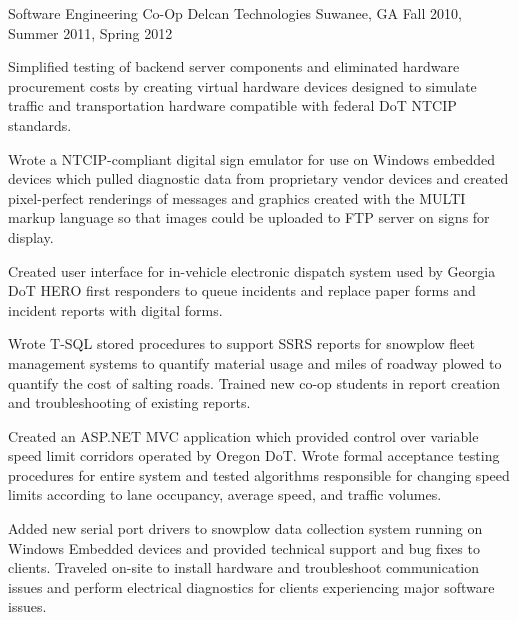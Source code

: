 \begin{cventries}
  \cventry
    {Software Engineering Co-Op} %
    {Delcan Technologies} %
    {Suwanee, GA} %
    {Fall 2010, Summer 2011, Spring 2012} %
    {
      \begin{cvitems} %
        \item {Simplified testing of backend server components and eliminated hardware procurement costs by creating virtual hardware devices designed to simulate traffic and transportation hardware compatible with federal DoT NTCIP standards.}
        \item {Wrote a NTCIP-compliant digital sign emulator for use on Windows embedded devices which pulled diagnostic data from proprietary vendor devices and created pixel-perfect renderings of messages and graphics created with the MULTI markup language so that images could be uploaded to FTP server on signs for display.}
		\item {Created user interface for in-vehicle electronic dispatch system used by Georgia DoT HERO first responders to queue incidents and replace paper forms and incident reports with digital forms.}
		\item {Wrote T-SQL stored procedures to support SSRS reports for snowplow fleet management systems to quantify material usage and miles of roadway plowed to quantify the cost of salting roads. Trained new co-op students in report creation and troubleshooting of existing reports.}
		\item {Created an ASP.NET MVC application which provided control over variable speed limit corridors operated by Oregon DoT. Wrote formal acceptance testing procedures for entire system and tested algorithms responsible for changing speed limits according to lane occupancy, average speed, and traffic volumes.}
		\item {Added new serial port drivers to snowplow data collection system running on Windows Embedded devices and provided technical support and bug fixes to clients. Traveled on-site to install hardware and troubleshoot communication issues and perform electrical diagnostics for clients experiencing major software issues.}
      \end{cvitems}
    }

\end{cventries}
